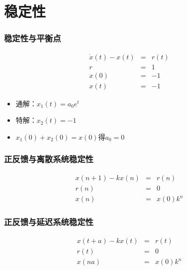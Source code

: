 \documentclass{beamer}
\begin{document}
\section{稳定性}
\label{sec-3}
\begin{frame}
\frametitle{稳定性与平衡点}
\label{sec-3-1}


\begin{eqnarray*}
\dot x(t)-x(t) & = & r(t)\\
r &=& 1 \\
x(0) &=& -1 \\
x(t) &=& -1
\end{eqnarray*}

\begin{itemize}
\item 通解：$x_1(t)=a_0e^t$
\item 特解：$x_2(t)=-1$
\item $x_1(0)+x_2(0)=x(0)$得$a_0=0$
\end{itemize}
\end{frame}
\begin{frame}
\frametitle{正反馈与离散系统稳定性}
\label{sec-3-2}

\begin{eqnarray*}
x(n+1)-kx(n) &=& r(n) \\
r(n) & = & 0 \\
x(n) &=& x(0)k^n
\end{eqnarray*}
\end{frame}
\begin{frame}
\frametitle{正反馈与延迟系统稳定性}
\label{sec-3-3}

\begin{eqnarray*}
x(t+a)-kx(t) &=& r(t) \\
r(t) &=& 0 \\
x(na) &=& x(0)k^{n}
\end{eqnarray*}
\end{frame}
\end{document}
